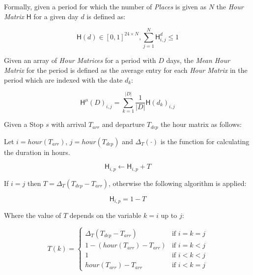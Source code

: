 Formally, given a period for which the number of \textit{Places} is given as $N$ the \textit{Hour Matrix} $\mathsf{H}$ for a given day $d$ is defined as:

\begin{equation}
\label{eq:feature-hour-matrix-def}
\mathsf{H}(d) \in [0,1]^{24 \times N}, \sum_{j=1}^N \mathsf{H}^d_{i,j} \leq 1
\end{equation}

Given an array of \textit{Hour Matrices} for a period with $D$ days, the \textit{Mean Hour Matrix} for the period is defined as the average entry for each \textit{Hour Matrix} in the period which are indexed with the date $d_k$:

\begin{equation}
\label{eq:feature-hour-matrix-mean}
\mathsf{H}^{\mu} (D) _{i,j} = \sum_{k=1}^{|D|} \frac{1}{|D|} \mathsf{H}(d_k)_{i,j}
\end{equation}

Given a Stop $s$ with arrival $T_{arr}$ and departure $T_{dep}$ the hour matrix as follows:

Let $i = hour(T_{arr})$, $j = hour(T_{dep})$ and $\Delta_ T(\cdot)$ is the function for calculating the duration in hours.

\begin{equation}
\label{eq:feature-hour-matrix-computation}
\mathsf{H}_{i,p} \leftarrow \mathsf{H}_{i,p} + T
\end{equation}

If $i = j$ then $T = \Delta_T (T_{dep} - T_{arr})$, otherwise the following algorithm is applied:

\begin{equation}
\label{eq:feature-hour-computaion2}
\mathsf{H}_{i,p} = 1 - T
\end{equation}

Where the value of $T$ depends on the variable $k = i$ up to $j$:

\begin{equation}
\label{eq:feature-hour-computaion3}
T(k) =
\begin{cases}
    \Delta_T (T_{dep} - T_{arr})    & \text{if $i = k = j$} \\
    1 - (hour(T_{arr}) - T_{arr})   & \text{if $i = k < j$} \\
    1                               & \text{if $i < k < j$} \\
    hour(T_{arr}) - T_{arr}         & \text{if $i < k = j$}
\end{cases}
\end{equation}


